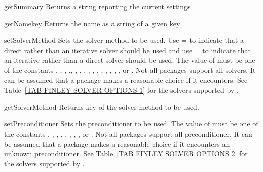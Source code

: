 \begin{methoddesc}[SolverOptions]{getSummary}{}
Returns a string reporting the current settings
\end{methoddesc}

\begin{methoddesc}[SolverOptions]{getName}{key}
Returns the name as a string of a given key
\end{methoddesc}

\begin{methoddesc}[SolverOptions]{setSolverMethod}{}
Sets the solver method to be used. Use = to indicate that a direct rather than an iterative solver should be used and use = to indicate that an iterative rather than a direct solver should be used. 
The value of  must be one of the constants
 , , , ,, , , , 
 , , , , , , , , 
 or .
Not all packages support all solvers. It can be assumed that a package makes a reasonable choice if it encounters. See Table~\ref{TAB FINLEY SOLVER OPTIONS 1} for the solvers supported by \finley.
\end{methoddesc}

\begin{methoddesc}[SolverOptions]{getSolverMethod}{}
Returns key of the solver method to be used. 
\end{methoddesc}

\begin{methoddesc}[SolverOptions]{setPreconditioner}{}
Sets the preconditioner to be used. 
The value of  must be one of the constants
, , , , 
, , , , or
.
Not all packages support all preconditioner. It can be assumed that a package makes a reasonable choice if it encounters
an unknown preconditioner. See Table~\ref{TAB FINLEY SOLVER OPTIONS 2} for the solvers supported by \finley.
\end{methoddesc}
   
